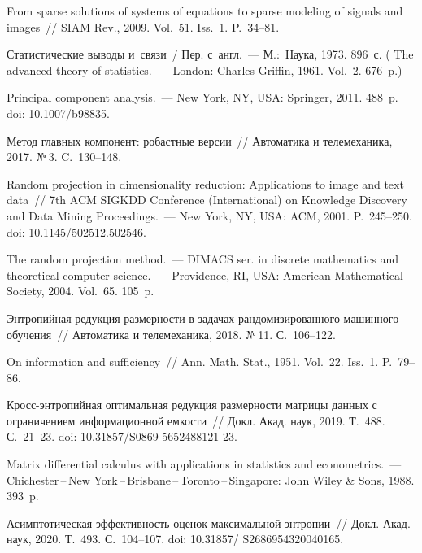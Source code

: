 \begin{multicols}{2}
{{\begin{thebibliography}{99}
 From sparse solutions of 
systems of equations to sparse modeling of signals and images~// SIAM Rev., 
2009. Vol.~51. Iss.~1. P.~34--81.

 Статистические выводы и~связи~/
Пер. с~англ.~--- М.:~Наука, 
1973. 896~с. ( {The advanced theory of statistics.}~--- 
London: Charles Griffin, 1961.  Vol.~2. 676~p.)

 Principal component analysis.~--- New York, NY, USA: 
Springer, 2011. 488~p. doi: 10.1007/b98835.

 Метод главных компонент: робастные 
версии~// Автоматика и телемеханика, 2017. №\,3. C.~130--148.

 Random projection in dimensionality reduction: 
Applications to image and text data~// 7th ACM SIGKDD Conference 
(International) on Knowledge Discovery and Data Mining Proceedings.~--- New 
York, NY, USA: ACM, 2001. P.~245--250. doi: 10.1145/502512.502546.

 The random projection method.~--- \mbox{DIMACS} ser. in discrete 
mathematics and theoretical computer science.~--- Providence, RI, USA: 
American Mathematical Society, 2004. Vol.~65. 105~p.

 Энтропийная редукция 
размерности в задачах рандомизированного машинного обучения~// Автоматика и 
телемеханика, 2018. №\,11. С.~106--122.

 On information and sufficiency~// Ann. 
Math. Stat., 1951. Vol.~22. Iss.~1. P.~79--86.

 Кросс-энтропийная оптимальная редукция 
размерности матрицы данных с ограничением информационной емкости~// Докл. 
Акад. наук, 2019. Т.~488. С.~21--23. doi: 10.31857/S0869-5652488121-23.

 Matrix differential calculus with 
applications in statistics and econometrics.~--- 
Chichester\,--\,New York\,--\,Brisbane\,--\,Toronto\,--\,Singapore: John 
Wiley \& Sons, 1988. 393~p.

 Асимптотическая эффективность оценок максимальной 
энтропии~// Докл. Акад. наук, 2020. Т.~493. С.~104--107. {doi: 
10.31857/ S2686954320040165}.


\end{thebibliography}}}
\end{multicols}
